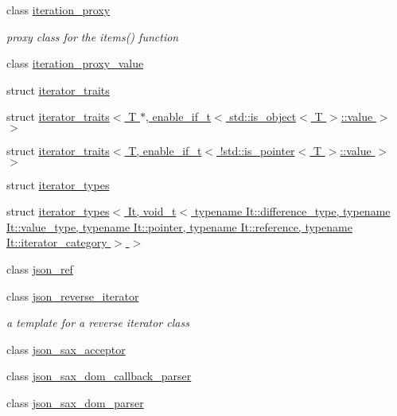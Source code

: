 \begin{DoxyCompactItemize}
class \hyperlink{classnlohmann_1_1detail_1_1iteration__proxy}{iteration\+\_\+proxy}
\begin{DoxyCompactList}\small\item\em proxy class for the items() function \end{DoxyCompactList}\item 
class \hyperlink{classnlohmann_1_1detail_1_1iteration__proxy__value}{iteration\+\_\+proxy\+\_\+value}
\item 
struct \hyperlink{structnlohmann_1_1detail_1_1iterator__traits}{iterator\+\_\+traits}
\item 
struct \hyperlink{structnlohmann_1_1detail_1_1iterator__traits_3_01_t_01_5_00_01enable__if__t_3_01std_1_1is__objec8d960665487688165530972cda4f1bea}{iterator\+\_\+traits$<$ T $\ast$, enable\+\_\+if\+\_\+t$<$ std\+::is\+\_\+object$<$ T $>$\+::value $>$ $>$}
\item 
struct \hyperlink{structnlohmann_1_1detail_1_1iterator__traits_3_01_t_00_01enable__if__t_3_01_9std_1_1is__pointer_3_01_t_01_4_1_1value_01_4_01_4}{iterator\+\_\+traits$<$ T, enable\+\_\+if\+\_\+t$<$ !std\+::is\+\_\+pointer$<$ T $>$\+::value $>$ $>$}
\item 
struct \hyperlink{structnlohmann_1_1detail_1_1iterator__types}{iterator\+\_\+types}
\item 
struct \hyperlink{structnlohmann_1_1detail_1_1iterator__types_3_01_it_00_01void__t_3_01typename_01_it_1_1differenc4a413e9bd546446175f10f15c5631361}{iterator\+\_\+types$<$ It, void\+\_\+t$<$ typename It\+::difference\+\_\+type, typename It\+::value\+\_\+type, typename It\+::pointer, typename It\+::reference, typename It\+::iterator\+\_\+category $>$ $>$}
\item 
class \hyperlink{classnlohmann_1_1detail_1_1json__ref}{json\+\_\+ref}
\item 
class \hyperlink{classnlohmann_1_1detail_1_1json__reverse__iterator}{json\+\_\+reverse\+\_\+iterator}
\begin{DoxyCompactList}\small\item\em a template for a reverse iterator class \end{DoxyCompactList}\item 
class \hyperlink{classnlohmann_1_1detail_1_1json__sax__acceptor}{json\+\_\+sax\+\_\+acceptor}
\item 
class \hyperlink{classnlohmann_1_1detail_1_1json__sax__dom__callback__parser}{json\+\_\+sax\+\_\+dom\+\_\+callback\+\_\+parser}
\item 
class \hyperlink{classnlohmann_1_1detail_1_1json__sax__dom__parser}{json\+\_\+sax\+\_\+dom\+\_\+parser}

\end{DoxyCompactItemize}
